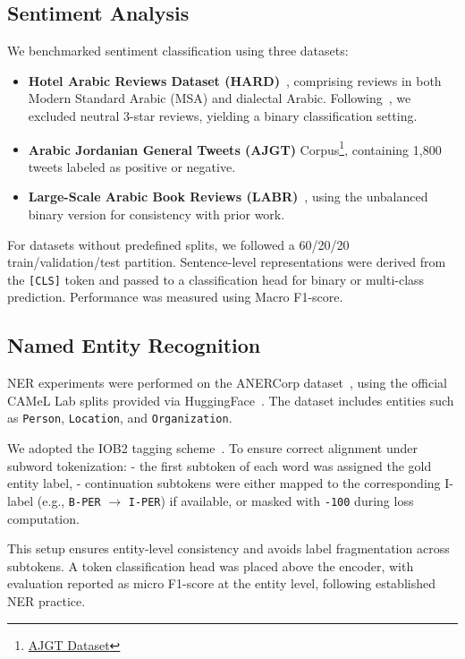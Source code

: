 \subsection{Sentiment Analysis}
We benchmarked sentiment classification using three datasets:  
\begin{itemize}
    \item \textbf{Hotel Arabic Reviews Dataset (HARD)}~\cite{Elnagar2018}, comprising reviews in both Modern Standard Arabic (MSA) and dialectal Arabic. Following~\cite{antoun2020arabert}, we excluded neutral 3-star reviews, yielding a binary classification setting.  
    \item \textbf{Arabic Jordanian General Tweets (AJGT)} Corpus\footnote{\href{https://github.com/komari6/Arabic-twitter-corpus-AJGT}{AJGT Dataset}}, containing 1,800 tweets labeled as positive or negative.  
    \item \textbf{Large-Scale Arabic Book Reviews (LABR)}~\cite{aly-atiya-2013-labr}, using the unbalanced binary version for consistency with prior work.  
\end{itemize}  

For datasets without predefined splits, we followed a 60/20/20 train/validation/test partition. Sentence-level representations were derived from the \texttt{[CLS]} token and passed to a classification head for binary or multi-class prediction. Performance was measured using Macro F1-score.  

\subsection{Named Entity Recognition}
NER experiments were performed on the ANERCorp dataset~\cite{Benajiba:2007}, using the official CAMeL Lab splits provided via HuggingFace~\cite{obeid2020camel}. The dataset includes entities such as \texttt{Person}, \texttt{Location}, and \texttt{Organization}.  

We adopted the IOB2 tagging scheme~\cite{Ramshaw1999}. To ensure correct alignment under subword tokenization:  
- the first subtoken of each word was assigned the gold entity label,  
- continuation subtokens were either mapped to the corresponding I-label (e.g., \texttt{B-PER} $\rightarrow$ \texttt{I-PER}) if available, or masked with \texttt{-100} during loss computation.  

This setup ensures entity-level consistency and avoids label fragmentation across subtokens. A token classification head was placed above the encoder, with evaluation reported as micro F1-score at the entity level, following established NER practice.  

